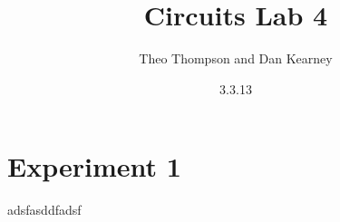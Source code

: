 \documentclass{article}
\title{Circuits Lab 4}
\author{Theo Thompson and Dan Kearney}
\date{3.3.13}
\begin{document}
\maketitle

\section*{Experiment 1}
adsfasddfadsf
\end{document}
